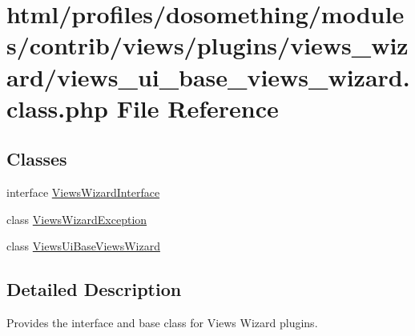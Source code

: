 \hypertarget{views__ui__base__views__wizard_8class_8php}{
\section{html/profiles/dosomething/modules/contrib/views/plugins/views\_\-wizard/views\_\-ui\_\-base\_\-views\_\-wizard.class.php File Reference}
\label{views__ui__base__views__wizard_8class_8php}
}
\subsection*{Classes}
\begin{DoxyCompactItemize}
\item 
interface \hyperlink{interfaceViewsWizardInterface}{ViewsWizardInterface}
\item 
class \hyperlink{classViewsWizardException}{ViewsWizardException}
\item 
class \hyperlink{classViewsUiBaseViewsWizard}{ViewsUiBaseViewsWizard}
\end{DoxyCompactItemize}


\subsection{Detailed Description}
Provides the interface and base class for Views Wizard plugins. 